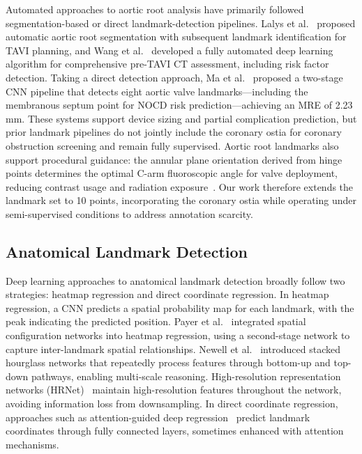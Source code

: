 \documentclass[conference]{IEEEtran}
\begin{document}
Automated approaches to aortic root analysis have primarily followed segmentation-based or direct landmark-detection pipelines. Lalys et al.~\cite{Lalys2019_tavi_segmentation} proposed automatic aortic root segmentation with subsequent landmark identification for TAVI planning, and Wang et al.~\cite{Wang2023_pretavr_dl} developed a fully automated deep learning algorithm for comprehensive pre-TAVI CT assessment, including risk factor detection. Taking a direct detection approach, Ma et al.~\cite{Ma2023_aortic_landmarks} proposed a two-stage CNN pipeline that detects eight aortic valve landmarks---including the membranous septum point for NOCD risk prediction---achieving an MRE of 2.23\,mm. These systems support device sizing and partial complication prediction, but prior landmark pipelines do not jointly include the coronary ostia for coronary obstruction screening and remain fully supervised. Aortic root landmarks also support procedural guidance: the annular plane orientation derived from hinge points determines the optimal C-arm fluoroscopic angle for valve deployment, reducing contrast usage and radiation exposure~\cite{Gurvitch2010_tavi_angulation,Achenbach2013_annular_plane,Arnold2012_carm_projection}. Our work therefore extends the landmark set to 10 points, incorporating the coronary ostia while operating under semi-supervised conditions to address annotation scarcity.

\subsection{Anatomical Landmark Detection}

Deep learning approaches to anatomical landmark detection broadly follow two strategies: heatmap regression and direct coordinate regression. In heatmap regression, a CNN predicts a spatial probability map for each landmark, with the peak indicating the predicted position. Payer et al.~\cite{Payer2019_integrating_spatial} integrated spatial configuration networks into heatmap regression, using a second-stage network to capture inter-landmark spatial relationships. Newell et al.~\cite{Newell2016_stacked_hourglass} introduced stacked hourglass networks that repeatedly process features through bottom-up and top-down pathways, enabling multi-scale reasoning. High-resolution representation networks (HRNet)~\cite{Sun2019_hrnet} maintain high-resolution features throughout the network, avoiding information loss from downsampling. In direct coordinate regression, approaches such as attention-guided deep regression~\cite{Zhong2019_attention_landmark} predict landmark coordinates through fully connected layers, sometimes enhanced with attention mechanisms.
\end{document}
